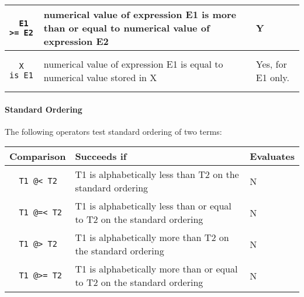 \documentclass{article}
\begin{document}
\begin{multicols}{2}
\begin{tabular}{ | p{2cm} | p{4cm} | p{1.4cm} | }
  \begin{lstlisting}
  E1 >= E2
  \end{lstlisting} & numerical value of expression E1 is more than or equal to numerical value of expression E2 & Y \\
  \hline
  
  \begin{lstlisting}
  X is E1
  \end{lstlisting} & numerical value of expression E1 is equal to numerical value stored in X & Yes, for E1 only. \\
  \hline
  \end{tabular}
  
  \paragraph{Standard Ordering} The following operators test standard ordering of two terms:
  
  \noindent 
  \begin{tabular}{ | p{2cm} | p{4cm} | p{1.4cm} | }
  \hline
  \bf Comparison & \bf Succeeds if & \bf Evaluates \\
  \hline
  
  \begin{lstlisting}
  T1 @< T2
  \end{lstlisting} & T1 is alphabetically less than T2 on the standard ordering & N \\
  \hline
  
  \begin{lstlisting}
  T1 @=< T2
  \end{lstlisting} & T1 is alphabetically less than or equal to T2 on the standard ordering & N \\
  \hline
  
  \begin{lstlisting}
  T1 @> T2
  \end{lstlisting} & T1 is alphabetically more than T2 on the standard ordering & N \\
  \hline
  
  \begin{lstlisting}
  T1 @>= T2
  \end{lstlisting} & T1 is alphabetically more than or equal to T2 on the standard ordering & N \\
  \hline
  
  \end{tabular}

  \end{multicols}
\end{document}
